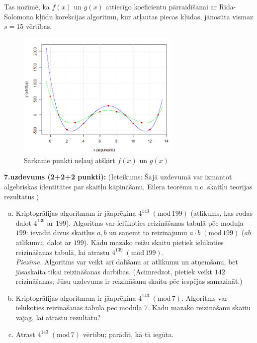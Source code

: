 \documentclass[11pt]{article}
\begin{document}
Tas nozīmē, ka $f(x)$ un $g(x)$ attiecīgo koeficientu pārraidīšanai ar Rīda-Solomona kļūdu korekcijas algoritmu, 
kur atļautas piecas kļūdas, jānosūta vismaz $s = 15$ vērtības. 

\begin{figure}[h!]
\begin{center}
\includegraphics[width=0.7\textwidth]{fall2019-midterm/reed-solomon-plot.png}
\caption{Sarkanie punkti neļauj atšķirt $f(x)$ un $g(x)$\label{fig:reed-solomon-plot}}
\end{center}
\end{figure}


{\footnotesize
\vspace{6pt}
{\bf 7.uzdevums (2+2+2 punkti):}
(Ieteikums: Šajā uzdevumā var izmantot algebriskas identitātes par skaitļu kāpināšanu, Eilera teorēmu u.c. skaitļu teorijas rezultātus.)
\begin{enumerate}[(a)]
\item Kriptogrāfijas algoritmam ir jāaprēķina $4^{143}\;(\text{mod}\,199)$ (atlikums, kas rodas dalot $4^{139}$ ar $199$).
Algoritms var ielūkoties reizināšanas tabulā pēc moduļa $199$: ievadīt divus skaitļus $a,b$ un saņemt to reizinājumu
$a\cdot{}b\;(\text{mod}\,199)$ ($ab$ atlikumu, dalot ar $199$).
Kādu mazāko reižu skaitu pietiek ielūkoties reizināšanas tabulā, lai atrastu $4^{139}\;(\text{mod}\,199)$.\\
{\em Piezīme.} Algoritms var veikt arī dalīšanu ar atlikumu un atņemšanu, bet jāsaskaita tikai reizināšanas darbības.
(Acīmredzot, pietiek veikt $142$ reizināšanas; Jūsu uzdevums ir reizināšanu skaitu pēc iespējas samazināt.)
\item Kriptogrāfijas algoritmam ir jāaprēķina $4^{143}\;(\text{mod}\,7)$. Algoritms var ielūkoties reizināšanas tabulā
pēc moduļa $7$. Kādu mazāko reizināšanu skaitu vajag, lai atrastu rezultātu?
\item Atrast $4^{143}\;(\text{mod}\,7)$ vērtību; parādīt, kā tā iegūta.
\end{enumerate}
}
\end{document}
